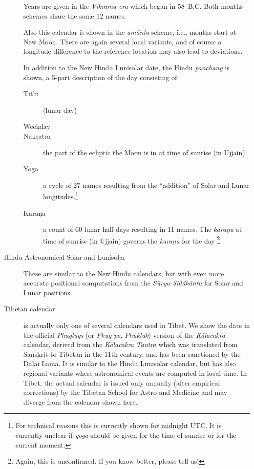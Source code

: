 \begin{description}
  Years are given in the \emph{Vikrama era} which began in
  58~B.C. Both months schemes share the same 12 names.

  Also this calendar is shown in the \emph{am\=anta} scheme, i.e.,
  months start at New Moon. There are again several local variants,
  and of course a longitude difference to the reference location may
  also lead to deviations.

  In addition to the New Hindu Lunisolar date, the Hindu \emph{panchang} is shown, a 5-part description of the day consisting of
  \begin{description}
  \item[Tithi] (lunar day)
  \item[Weekday]
  \item[Nak\d{s}atra] the part of the ecliptic the Moon is in at time of sunrise (in Ujjain).
  \item[Yoga] a cycle of 27 names resulting from the ``addition'' of
    Solar and Lunar longitudes.\footnote{For technical reasons this
      is currently shown for midnight UTC. It is currently unclear if
      \emph{yoga} should be given for the time of sunrise or for the
      current moment.}
  \item[Kara\d{n}a] a count of 60 lunar half-days resulting in 11
    names. The \emph{kara\d{n}a} at time of sunrise (in Ujjain)
    governs the \emph{kara\d{n}a} for the day \footnote{Again, this is
      unconfirmed. If you know better, please tell us!}.
  \end{description}
  
\item[Hindu Astronomical Solar and Lunisolar] These are similar to the
  New Hindu calendars, but with even more accurate
  positional computations from the \emph{S\=urya-Siddh\=anta} for
  Solar and Lunar positions.
\item[Tibetan calendar] is actually only one of several calendars%
   used in Tibet. We show the date in the official
  \emph{Phuglugs} (or \emph{Phug-pa}, \emph{Phukluk}) version of the
  \emph{K\=alacakra} calendar, derived from the \emph{K\=alacakra
    Tantra} which was translated from Sanskrit to Tibetan in the 11th
  century, and has been sanctioned by the Dalai Lama. It is similar to
  the Hindu Lunisolar calendar, but has also regional variants where
  astronomical events are computed in local time. In Tibet, the actual
  calendar is issued only annually (after empirical corrections) by
  the Tibetan School for Astro and Medicine and may diverge from the
  calendar shown here.


\end{description}
